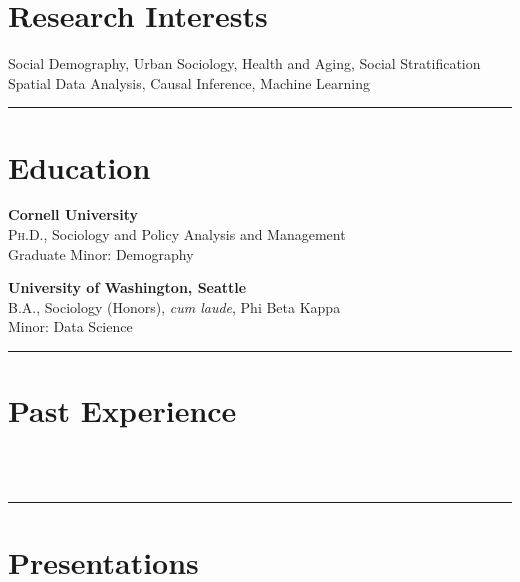 \documentclass[11pt]{article} %
\begin{document}
\section*{Research Interests}

\large{} Social Demography, Urban Sociology, Health and Aging, Social Stratification \\
\large{} Spatial Data Analysis, Causal Inference, Machine Learning \\
\noindent\rule{16cm}{0.4pt}

\section*{Education}
 
  \textbf{Cornell University} \\
 \textsc{Ph.D.}, Sociology and Policy Analysis and Management \\
	Graduate Minor: Demography
 
 \smallskip
{} \textbf{University of Washington, Seattle} \\
\textsc{B.A.}, Sociology (Honors), \emph{cum laude}, Phi Beta Kappa \\
Minor: Data Science \\

\noindent\rule{16cm}{0.4pt}

\section*{Past Experience}

  \\
\\
\noindent\rule{16cm}{0.4pt}

\section*{Presentations}
\end{document}
